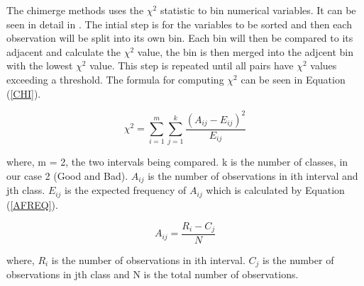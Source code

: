 The chimerge methods uses the $\chi^2$ statistic to bin numerical variables. It can be seen in detail in \parencite{kerber1992chimerge}. The intial step is for the variables to be sorted and then each observation will be split into its own bin. Each bin will then be compared to its adjacent and calculate the $\chi^2$ value, the bin is then merged into the adjcent bin with the lowest $\chi^2$ value. This step is repeated until all pairs have $\chi^2$ values exceeding a threshold. The formula for computing $\chi^2$ can be seen in Equation (\ref{CHI}).

\begin{equation}\label{CHI}
\chi^2 = \sum^{m}_{i=1}\sum^{k}_{j=1} \dfrac{(A_{ij} - E_{ij})^2}{ E_{ij}}
\end{equation}

where, m = 2, the two intervals being compared. k is the number of classes, in our case 2 (Good and Bad). $A_{ij}$ is the number of observations in ith interval and jth class. $E_{ij}$ is the expected frequency of $A_{ij}$ which is calculated by Equation (\ref{AFREQ}).

\begin{equation}\label{AFREQ}
A_{ij} = \dfrac{R_i - C_j}{N}
\end{equation}

where, $R_i$ is the number of observations in ith interval. $C_j$ is the number of observations in jth class and N is the total number of observations.

